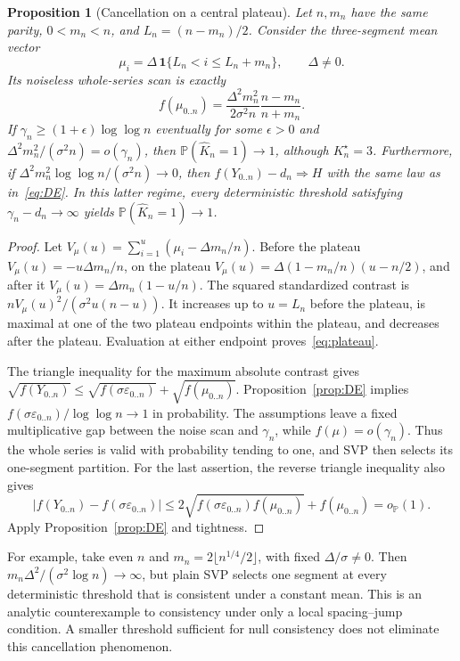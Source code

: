 \documentclass[pdflatex,sn-mathphys-num]{sn-jnl}
\newcommand{\Prob}{\mathbb P}
\newcommand{\Kh}{\widehat K_n}
\newcommand{\op}{o_{\Prob}}
\theoremstyle{thmstyleone}
\newtheorem{proposition}[theorem]{Proposition}
\theoremstyle{thmstyletwo}
\begin{document}
\begin{proposition}[Cancellation on a central plateau]\label{prop:plateau}
Let $n,m_n$ have the same parity, $0<m_n<n$, and
$L_n=(n-m_n)/2$. Consider the three-segment mean vector
\[
\mu_i=\Delta\,\mathbf1\{L_n<i\le L_n+m_n\},\qquad \Delta\ne0.
\]
Its noiseless whole-series scan is exactly
\begin{equation}\label{eq:plateau}
f(\mu_{0..n})=
\frac{\Delta^2m_n^2}{2\sigma^2n}\frac{n-m_n}{n+m_n}.
\end{equation}
If $\gamma_n\ge(1+\epsilon)\log\log n$ eventually for some $\epsilon>0$ and
$\Delta^2m_n^2/(\sigma^2n)=o(\gamma_n)$, then
$\Prob(\Kh=1)\to1$, although $K_n^\star=3$.
Furthermore, if
$\Delta^2m_n^2\log\log n/(\sigma^2n)\to0$, then
$f(Y_{0..n})-d_n\Longrightarrow H$ with the same law as in~\eqref{eq:DE}.
In this latter regime, every deterministic threshold satisfying
$\gamma_n-d_n\to\infty$ yields $\Prob(\Kh=1)\to1$.
\end{proposition}
\begin{proof}
Let $V_\mu(u)=\sum_{i=1}^u(\mu_i-\Delta m_n/n)$.
Before the plateau $V_\mu(u)=-u\Delta m_n/n$, on the plateau
$V_\mu(u)=\Delta(1-m_n/n)(u-n/2)$, and after it
$V_\mu(u)=\Delta m_n(1-u/n)$.
The squared standardized contrast is $nV_\mu(u)^2/(\sigma^2u(n-u))$.
It increases up to $u=L_n$ before the plateau, is maximal at one of the
two plateau endpoints within the plateau, and decreases after the plateau.
Evaluation at either endpoint proves~\eqref{eq:plateau}.

The triangle inequality for the maximum absolute contrast gives
$\sqrt{f(Y_{0..n})}\le\sqrt{f(\sigma\varepsilon_{0..n})}
+\sqrt{f(\mu_{0..n})}$.
Proposition~\ref{prop:DE} implies
$f(\sigma\varepsilon_{0..n})/\log\log n\to1$ in probability.
The assumptions leave a fixed multiplicative gap between the noise scan
and $\gamma_n$, while $f(\mu)=o(\gamma_n)$.
Thus the whole series is valid with probability tending to one, and SVP
then selects its one-segment partition.
For the last assertion, the reverse triangle inequality also gives
\[
|f(Y_{0..n})-f(\sigma\varepsilon_{0..n})|
\le2\sqrt{f(\sigma\varepsilon_{0..n})f(\mu_{0..n})}+f(\mu_{0..n})=\op(1).
\]
Apply Proposition~\ref{prop:DE} and tightness.
\end{proof}

For example, take even $n$ and $m_n=2\lfloor n^{1/4}/2\rfloor$, with fixed
$\Delta/\sigma\ne0$. Then
$m_n\Delta^2/(\sigma^2\log n)\to\infty$, but plain SVP selects one segment
at every deterministic threshold that is consistent under a constant mean.
This is an analytic counterexample to consistency under only a local
spacing--jump condition. A smaller threshold sufficient for null
consistency does not eliminate this cancellation phenomenon.
\end{document}
